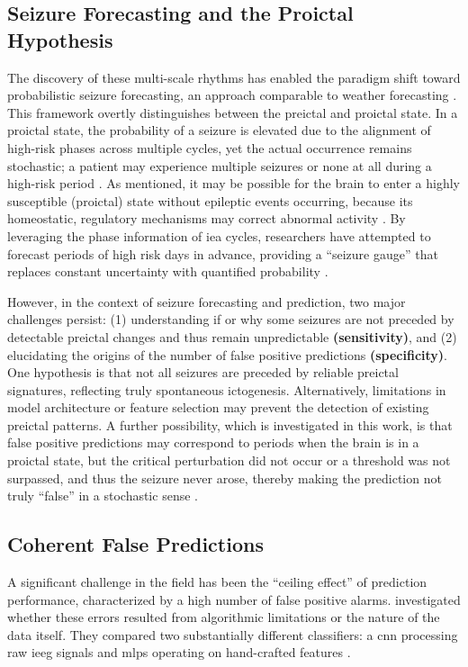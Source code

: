 \subsection{Seizure Forecasting and the Proictal Hypothesis}
The discovery of these multi-scale rhythms has enabled the paradigm shift toward probabilistic seizure forecasting, an approach comparable to weather forecasting \parencite{proix_forecasting_2021, karoly_cycles_2021}. 
This framework overtly distinguishes between the preictal and proictal state. 
In a proictal state, the probability of a seizure is elevated due to the alignment of high-risk phases across multiple cycles, yet the actual occurrence remains stochastic; a patient may experience multiple seizures or none at all during a high-risk period \parencite{karoly_cycles_2021}.
As mentioned, it may be possible for the brain to enter a highly susceptible (proictal) state without epileptic events occurring, because its homeostatic, regulatory mechanisms may correct abnormal activity \parencite{buzsaki_rhythms_2006, freestone_forward-looking_2017}.
By leveraging the phase information of \gls{iea} cycles, researchers have attempted to forecast periods of high risk days in advance, providing a \enquote{seizure gauge} that replaces constant uncertainty with quantified probability \parencite{proix_forecasting_2021}.

However, in the context of seizure forecasting and prediction, two major challenges persist: (1) understanding if or why some seizures are not preceded by detectable preictal changes and thus remain unpredictable \textbf{(sensitivity)}, and (2) elucidating the origins of the number of false positive predictions \textbf{(specificity)}.
One hypothesis is that not all seizures are preceded by reliable preictal signatures, reflecting truly spontaneous ictogenesis.
Alternatively, limitations in model architecture or feature selection may prevent the detection of existing preictal patterns.
A further possibility, which is investigated in this work, is that false positive predictions may correspond to periods when the brain is in a proictal state, but the critical perturbation did not occur or a threshold was not surpassed, and thus the seizure never arose, thereby making the prediction not truly \enquote{false} in a stochastic sense \parencite{muller_coherent_2022}.


\subsection{Coherent False Predictions}
A significant challenge in the field has been the \enquote{ceiling effect} of prediction performance, characterized by a high number of false positive alarms.
\textcite{muller_coherent_2022} investigated whether these errors resulted from algorithmic limitations or the nature of the data itself. 
They compared two substantially different classifiers: a \gls{cnn} processing raw \gls{ieeg} signals and \glspl{mlp} operating on hand-crafted features \parencite{muller_coherent_2022}.

